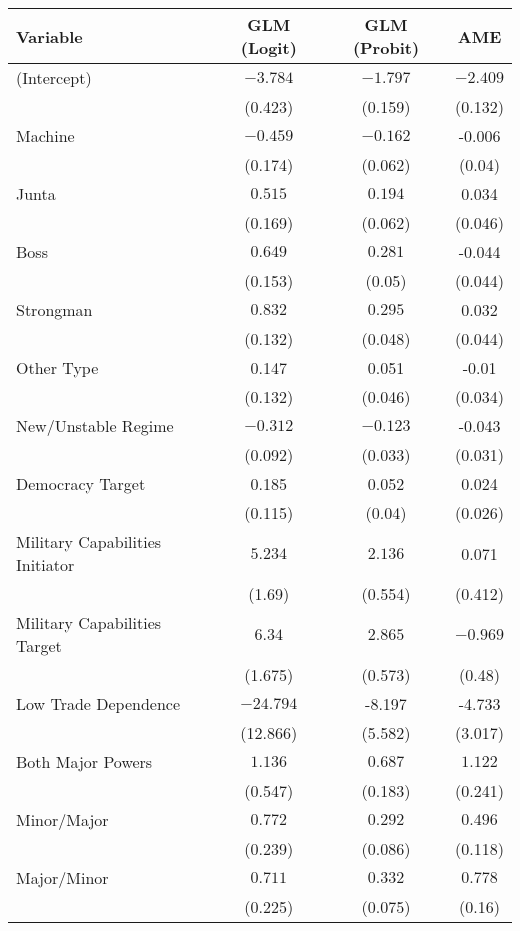 \begin{table}[ht]
\centering
\begingroup\scriptsize
\begin{tabular}{lccc}
 Variable & GLM (Logit) & GLM (Probit) & AME \\ 
  \hline
\hline
(Intercept) & $-3.784$ & $-1.797$ & $-2.409$ \\
   & (0.423) & (0.159) & (0.132) \\ 
  Machine & $-0.459$ & $-0.162$ & -0.006 \\
   & (0.174) & (0.062) & (0.04) \\ 
  Junta & $0.515$ & $0.194$ & 0.034 \\
   & (0.169) & (0.062) & (0.046) \\ 
  Boss & $0.649$ & $0.281$ & -0.044 \\
   & (0.153) & (0.05) & (0.044) \\ 
  Strongman & $0.832$ & $0.295$ & 0.032 \\
   & (0.132) & (0.048) & (0.044) \\ 
  Other Type & 0.147 & 0.051 & -0.01 \\ 
   & (0.132) & (0.046) & (0.034) \\ 
  New/Unstable Regime & $-0.312$ & $-0.123$ & -0.043 \\
   & (0.092) & (0.033) & (0.031) \\ 
  Democracy Target & 0.185 & 0.052 & 0.024 \\ 
   & (0.115) & (0.04) & (0.026) \\ 
  Military Capabilities Initiator & $5.234$ & $2.136$ & 0.071 \\
   & (1.69) & (0.554) & (0.412) \\ 
  Military Capabilities Target  & $6.34$ & $2.865$ & $-0.969$ \\
   & (1.675) & (0.573) & (0.48) \\ 
  Low Trade Dependence  & $-24.794$ & -8.197 & -4.733 \\ 
   & (12.866) & (5.582) & (3.017) \\ 
  Both Major Powers & $1.136$ & $0.687$ & $1.122$ \\
   & (0.547) & (0.183) & (0.241) \\ 
  Minor/Major & $0.772$ & $0.292$ & $0.496$ \\
   & (0.239) & (0.086) & (0.118) \\ 
  Major/Minor & $0.711$ & $0.332$ & $0.778$ \\
   & (0.225) & (0.075) & (0.16) \\ 

\end{tabular}
\end{table}
